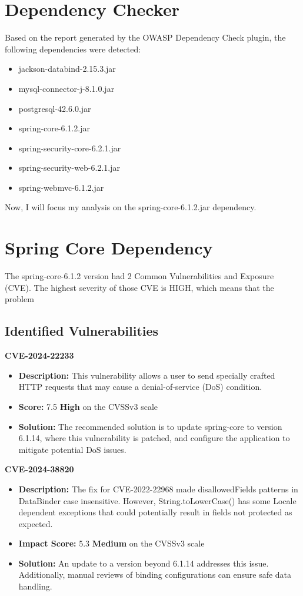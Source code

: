 \documentclass[a4paper,11pt,openright,BCOR=15mm]{scrbook}
\begin{document}
\section{Dependency Checker}
Based on the report generated by the OWASP Dependency Check plugin, the following dependencies were detected:
\begin{itemize}
	\item jackson-databind-2.15.3.jar
	\item mysql-connector-j-8.1.0.jar
	\item postgresql-42.6.0.jar
	\item spring-core-6.1.2.jar
	\item spring-security-core-6.2.1.jar
	\item spring-security-web-6.2.1.jar
	\item spring-webmvc-6.1.2.jar
\end{itemize}

Now, I will focus my analysis on the spring-core-6.1.2.jar dependency.

\section{Spring Core Dependency}
The spring-core-6.1.2 version had 2 Common Vulnerabilities and Exposure (CVE). The highest severity of those CVE is HIGH, which means that the problem 
\subsection{Identified Vulnerabilities}

\textbf{CVE-2024-22233}
\begin{itemize}
	\item \textbf{Description: }This vulnerability allows a user to send specially crafted HTTP requests that may cause a denial-of-service (DoS) condition.
	\item \textbf{Score: }7.5 \textbf{High} on the CVSSv3 scale
	\item \textbf{Solution:} The recommended solution is to update spring-core to version 6.1.14, where this vulnerability is patched, and configure the application to mitigate potential DoS issues.
\end{itemize}
\textbf{CVE-2024-38820}
\begin{itemize}
	\item \textbf{Description: }The fix for CVE-2022-22968 made disallowedFields patterns in DataBinder case insensitive. However, String.toLowerCase() has some Locale dependent exceptions that could potentially result in fields not protected as expected.
	\item \textbf{Impact Score: }5.3 \textbf{Medium} on the CVSSv3 scale
	\item \textbf{Solution:} An update to a version beyond 6.1.14 addresses this issue. Additionally, manual reviews of binding configurations can ensure safe data handling.
\end{itemize}
\end{document}
